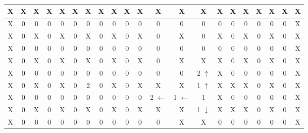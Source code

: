 			\begin{center}
				\begin{tabular}{|c|c|c|c|c|c|c|c|c|c|c|c|c|c|c|c|c|c|c|c|c|} \hline
				\rowcolor{cyan} X & X & X & X & X & X & X & X & X & X & X & X & X & X & X & X & X & X & X & X & X \\\hline
				\cellcolor{cyan}X & 0 & 0 & 0 & 0 & 0 & 0 & 0 & 0 & 0 & 0 & 0 & 0 & 0 & 0 & 0 & 0 & 0 & 0 & 0 & \cellcolor{cyan}X \\\hline
				\cellcolor{cyan}X & 0 & \cellcolor{cyan}\cellcolor{cyan}X & 0 & \cellcolor{cyan}X & 0 & \cellcolor{cyan}X & 0 & \cellcolor{cyan}X & 0 & \cellcolor{cyan}X & 0 & \cellcolor{cyan}X & 0 & \cellcolor{cyan}X &	0 & \cellcolor{cyan}X & 0 & \cellcolor{cyan}X & 0 & \cellcolor{cyan}X \\\hline
				\cellcolor{cyan}X & 0 & 0 & 0 & 0 & 0 & 0 & 0 & 0 & 0 & 0 & 0 & 0 & 0 & 0 & 0 & 0 & 0 & 0 & 0 & \cellcolor{cyan}X \\\hline
				\cellcolor{cyan}X & 0 & \cellcolor{cyan}X & 0 & \cellcolor{cyan}X & 0 & \cellcolor{cyan}X & 0 & \cellcolor{cyan}X & 0 & \cellcolor{cyan}X & 0 & \cellcolor{cyan}X & \cellcolor{cyan}X & \cellcolor{cyan}X & 0 & \cellcolor{cyan}X & 0 & \cellcolor{cyan}X & 0 & \cellcolor{cyan}X \\\hline
				\cellcolor{cyan}X & 0 & 0 & 0 & 0 & 0 & 0 & 0 & 0 & 0 & 0 & 0 & 0 & \cellcolor{orange}2 $\uparrow$ & \cellcolor{cyan}X & 0 & 0 & 0 & 0 & 0 & \cellcolor{cyan}X \\\hline
				\cellcolor{cyan}X & 0 & \cellcolor{cyan}X & 0 & \cellcolor{cyan}X & 0 & \cellcolor{cyan}2 & 0 & \cellcolor{cyan}X & 0 & \cellcolor{cyan}X & \cellcolor{cyan}X & \cellcolor{cyan}X & \cellcolor{orange}1 $\uparrow$ & \cellcolor{cyan}X & \cellcolor{cyan}X & \cellcolor{cyan}X & 0 & \cellcolor{cyan}X & 0 & \cellcolor{cyan}X \\\hline
				\cellcolor{cyan}X & 0 & 0 & 0 & 0 & 0 & 0 & 0 & 0 & 0 & 0 & \cellcolor{orange}2 $\leftarrow$ & \cellcolor{orange}1 $\leftarrow$ & \cellcolor{orange}1 & \cellcolor{gray}X & 0 & 0 & 0 & 0 & 0 & \cellcolor{cyan}X \\\hline
				\cellcolor{cyan}X & 0 & \cellcolor{cyan}X & 0 & \cellcolor{cyan}X & 0 & \cellcolor{cyan}X & 0 & \cellcolor{cyan}X & 0 & \cellcolor{cyan}X & \cellcolor{cyan}X & \cellcolor{cyan}X & \cellcolor{orange}1 $\downarrow$ & \cellcolor{cyan}X & \cellcolor{cyan}X & \cellcolor{cyan}X & 0 & \cellcolor{cyan}X & 0 & \cellcolor{cyan}X \\\hline
				\cellcolor{cyan}X & 0 & 0 & 0 & 0 & 0 & 0 & 0 & 0 & 0 & 0 & 0 & \cellcolor{cyan}X & \cellcolor{gray}X & 0 & 0 & 0 & 0 & 0 & 0 & \cellcolor{cyan}X \\\hline

\end{tabular}
\end{center}
